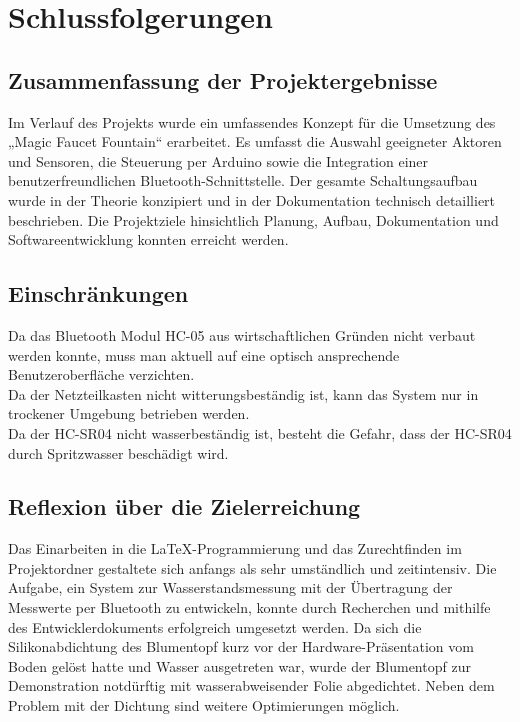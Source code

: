%
%
%


\chapter{Schlussfolgerungen}\label{Schlussfolgerungen}

\section{Zusammenfassung der Projektergebnisse}
Im Verlauf des Projekts wurde ein umfassendes Konzept für die Umsetzung des „Magic Faucet Fountain“ erarbeitet. Es umfasst die Auswahl geeigneter Aktoren und Sensoren, die Steuerung per Arduino sowie die Integration einer benutzerfreundlichen Bluetooth-Schnittstelle. Der gesamte Schaltungsaufbau wurde in der Theorie konzipiert und in der Dokumentation technisch detailliert beschrieben. Die Projektziele hinsichtlich Planung, Aufbau, Dokumentation und Softwareentwicklung konnten erreicht werden.

\section{Einschränkungen}
Da das Bluetooth Modul HC-05 aus wirtschaftlichen Gründen nicht verbaut werden konnte, muss man aktuell auf eine optisch ansprechende Benutzeroberfläche verzichten. \\
Da der Netzteilkasten nicht witterungsbeständig ist, kann das System nur in trockener Umgebung betrieben werden.\\
Da der HC-SR04 nicht wasserbeständig ist, besteht die Gefahr, dass der HC-SR04 durch Spritzwasser beschädigt wird.

\section{Reflexion über die Zielerreichung}
Das Einarbeiten in die LaTeX-Programmierung und das Zurechtfinden im Projektordner gestaltete sich anfangs als sehr umständlich und zeitintensiv.
Die Aufgabe, ein System zur Wasserstandsmessung mit der Übertragung der Messwerte per Bluetooth zu entwickeln, konnte durch Recherchen und mithilfe des Entwicklerdokuments erfolgreich umgesetzt werden.
Da sich die Silikonabdichtung des Blumentopf kurz vor der Hardware-Präsentation vom Boden gelöst hatte und Wasser ausgetreten war, wurde der Blumentopf zur Demonstration notdürftig mit wasserabweisender Folie abgedichtet.
Neben dem Problem mit der Dichtung sind weitere Optimierungen möglich.
